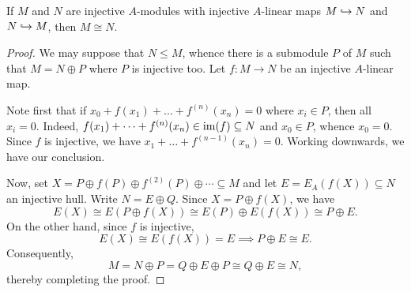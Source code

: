 \begin{theorem}
    If $M$ and $N$ are injective $A$-modules with injective $A$-linear maps $M\hookrightarrow N$ and $N\hookrightarrow M$, then $M\cong N$.
\end{theorem}
\begin{proof}
    We may suppose that $N\le M$, whence there is a submodule $P$ of $M$ such that $M = N\oplus P$ where $P$ is injective too. Let $f: M\to N$ be an injective $A$-linear map.

    Note first that if $x_0 + f(x_1) + \dots + f^{(n)}(x_n) = 0$ where $x_i\in P$, then all $x_i = 0$. Indeed, $f(x_1) + \dots + f^{(n)}(x_n)\in\operatorname{im}(f)\subseteq N$ and $x_0\in P$, whence $x_0 = 0$. Since $f$ is injective, we have $x_1 + \dots + f^{(n - 1)}(x_n) = 0$. Working downwards, we have our conclusion. 

    Now, set $X = P\oplus f(P)\oplus f^{(2)}(P)\oplus\cdots\subseteq M$ and let $E = E_A(f(X))\subseteq N$ an injective hull. Write $N = E\oplus Q$. Since $X = P\oplus f(X)$, we have 
    \begin{equation*}
        E(X)\cong E(P\oplus f(X))\cong E(P)\oplus E(f(X))\cong P\oplus E.
    \end{equation*}
    On the other hand, since $f$ is injective,
    \begin{equation*}
        E(X)\cong E(f(X)) = E\implies P\oplus E\cong E.
    \end{equation*}
    Consequently,
    \begin{equation*}
        M = N\oplus P = Q\oplus E\oplus P\cong Q\oplus E\cong N,
    \end{equation*}
    thereby completing the proof.
\end{proof}
